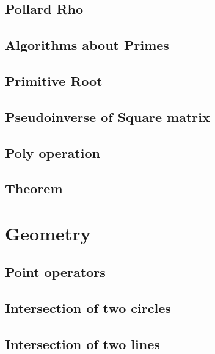\documentclass[a4paper,10pt,twocolumn,oneside]{article}
\begin{document}
\subsection{Pollard Rho}


\subsection{Algorithms about Primes}


\subsection{Primitive Root}


\subsection{Pseudoinverse of Square matrix}


\subsection{Poly operation}


\subsection{Theorem}



\section{Geometry}
\subsection{Point operators}


\subsection{Intersection of two circles}


\subsection{Intersection of two lines}

\end{document}
